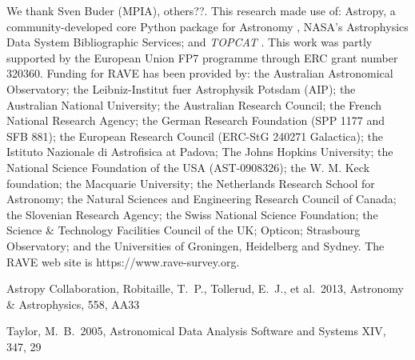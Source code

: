 \documentclass[preprint2,trackchanges]{aastex}
\newcommand{\project}[1]{\textsl{#1}}
\begin{document}
\acknowledgements
We thank Sven Buder (MPIA), others??.
This research made use of: Astropy, a community-developed core Python package for
Astronomy \citep{astropy}, NASA's Astrophysics Data System Bibliographic Services;
 and \project{TOPCAT} \citep{Taylor2005}.
This work was partly supported by the European Union FP7 programme through ERC 
grant number 320360.
Funding for RAVE has been provided by: the Australian Astronomical Observatory; the Leibniz-Institut fuer Astrophysik Potsdam (AIP); the Australian National University; the Australian Research Council; the French National Research Agency; the German Research Foundation (SPP 1177 and SFB 881); the European Research Council (ERC-StG 240271 Galactica); the Istituto Nazionale di Astrofisica at Padova; The Johns Hopkins University; the National Science Foundation of the USA (AST-0908326); the W. M. Keck foundation; the Macquarie University; the Netherlands Research School for Astronomy; the Natural Sciences and Engineering Research Council of Canada; the Slovenian Research Agency; the Swiss National Science Foundation; the Science \& Technology Facilities Council of the UK; Opticon; Strasbourg Observatory; and the Universities of Groningen, Heidelberg and Sydney. The RAVE web site is https://www.rave-survey.org.  



\begin{thebibliography}{dummy}
 Astropy Collaboration, Robitaille, T.~P., Tollerud, E.~J., et al.\ 2013, Astronomy \& Astrophysics, 558, AA33

 Taylor, M.~B.\ 2005, Astronomical Data Analysis Software and Systems XIV, 347, 29 

\end{thebibliography}

\clearpage




\end{document}
